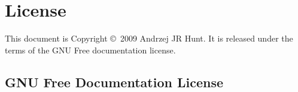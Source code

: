 \chapter{License}
This document is Copyright \copyright\ 2009 Andrzej JR Hunt. It is released under the terms of the GNU Free documentation license.
\section{GNU Free Documentation License}



